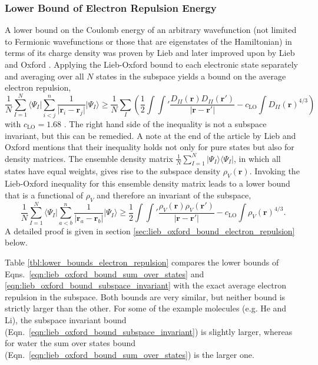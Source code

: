 \documentclass[journal=jpca,manuscript=article,layout=singlecolumn]{achemso}
\renewcommand\vec[1]{\mathbf{#1}}
\begin{document}
\subsubsection{Lower Bound of Electron Repulsion Energy}
A lower bound on the Coulomb energy of an arbitrary wavefunction
(not limited to Fermionic wavefunctions or those that are eigenstates of the Hamiltonian) in terms of
its charge density was proven by Lieb \cite{Lieb1979} and later improved upon by Lieb and Oxford \cite{Lieb1981}.
Applying the Lieb-Oxford bound to each electronic state separately and averaging over all $N$ states in the subspace
yields a bound on the average electron repulsion,
\begin{equation}
\frac{1}{N} \sum_{I=1}^{N} \langle \Psi_{I} \vert \sum_{i < j}^{n} \frac{1}{\vert \vec{r}_i - \vec{r}_j \vert} \vert \Psi_{I} \rangle
\geq \frac{1}{N} \sum_{I} \left( \frac{1}{2} \int \int' \frac{D_{II}(\vec{r}) D_{II}(\vec{r}')}{\vert \vec{r} - \vec{r}' \vert}
 - c_{\text{LO}} \int D_{II}(\vec{r})^{4/3} \right) \label{eqn:lieb_oxford_bound_sum_over_states} 
\end{equation}
with $c_{\text{LO}} = 1.68$ \cite{Lieb1981}. The right hand side of the inequality is not a subspace invariant, but this can be
remedied. A note at the end of the article by Lieb and Oxford \cite{Lieb1981} mentions that their inequality holds not only for pure states
but also for density matrices. The ensemble density matrix $\frac{1}{N} \sum_{I=1}^{N} \vert \Psi_I \rangle \langle \Psi_I \vert$, in which all
states have equal weights, gives rise to the subspace density $\rho_V(\vec{r})$. Invoking the Lieb-Oxford inequality for this ensemble
density matrix leads to a lower bound that is a functional of $\rho_V$ and therefore an invariant of the subspace,
\begin{equation}
  \frac{1}{N} \sum_{I=1}^{N} \langle \Psi_{I} \vert \sum_{a < b}^{n} \frac{1}{\vert \vec{r}_a - \vec{r}_b \vert} \vert \Psi_{I} \rangle
  \geq \frac{1}{2} \int \int' \frac{\rho_V(\vec{r}) \rho_V(\vec{r}')}{\vert \vec{r} - \vec{r}' \vert}
   - c_{\text{LO}} \int \rho_V(\vec{r})^{4/3}. \label{eqn:lieb_oxford_bound_subspace_invariant} 
\end{equation}
A detailed proof is given in section \ref{sec:lieb_oxford_bound_electron_repulsion} below.

Table \ref{tbl:lower_bounds_electron_repulsion} compares the lower bounds of Eqns.~\ref{eqn:lieb_oxford_bound_sum_over_states} and
\ref{eqn:lieb_oxford_bound_subspace_invariant} with the exact average electron repulsion in the subspace. Both bounds are very similar,
but neither bound is strictly larger than the other. For some of the example molecules (e.g. He and Li), the subspace invariant
bound (Eqn.~\ref{eqn:lieb_oxford_bound_subspace_invariant}) is slightly larger,
whereas for water the sum over states bound (Eqn.~\ref{eqn:lieb_oxford_bound_sum_over_states}) is the larger one.
\end{document}
